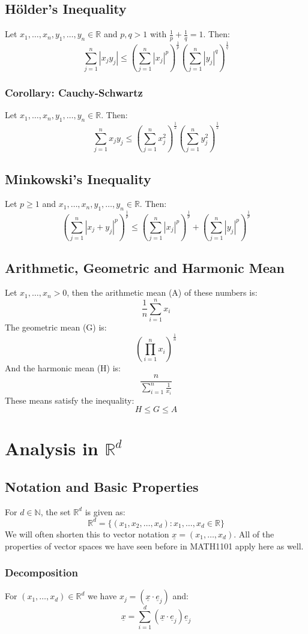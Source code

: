 \documentclass[12pt]{article}
\begin{document}
\subsection{H\"older's Inequality}
Let \(x_1,\dots,x_n,y_1,\dots,y_n\in\mathbb{R}\) and \(p,q>1\) with \(\frac{1}{p}+\frac{1}{q}=1\). Then:
\[\sum^n_{j=1}|x_jy_j|\leq \left(\sum^n_{j=1}|x_j|^p\right)^{\frac{1}{p}}\left(\sum^n_{j=1}|y_j|^q\right)^{\frac{1}{q}}\]
\subsubsection{Corollary: Cauchy-Schwartz}
Let \(x_1,\dots,x_n,y_1,\dots,y_n\in\mathbb{R}\). Then:
\[\sum^n_{j=1}x_jy_j\leq \left(\sum^n_{j=1}x_j^2\right)^{\frac{1}{2}}\left(\sum^n_{j=1}y_j^2\right)^{\frac{1}{2}}\]
\subsection{Minkowski's Inequality}
Let \(p\geq 1\) and \(x_1,\dots,x_n,y_1,\dots,y_n\in\mathbb{R}\). Then:
\[\left(\sum^n_{j=1}|x_j+y_j|^p\right)^{\frac{1}{p}}\leq\left(\sum^n_{j=1}|x_j|^p\right)^{\frac{1}{p}}+\left(\sum^n_{j=1}|y_j|^p\right)^{\frac{1}{p}}\]
\subsection{Arithmetic, Geometric and Harmonic Mean}
Let \(x_1,\dots,x_n>0\), then the arithmetic mean (A) of these numbers is:
\[\frac{1}{n}\sum^n_{i=1}x_i\]
The geometric mean (G) is:
\[\left(\prod^n_{i=1}x_i\right)^{\frac{1}{n}}\]
And the harmonic mean (H) is:
\[\frac{n}{\sum^n_{i=1}\frac{1}{x_i}}\]
These means satisfy the inequality:
\[H\leq G\leq A\]
\clearpage
\section{Analysis in \(\mathbb{R}^d\)}
\subsection{Notation and Basic Properties}
For \(d\in\mathbb{N}\), the set \(\mathbb{R}^d\) is given as:
\[\mathbb{R}^d=\{(x_1,x_2,\dots,x_d):x_1,\dots,x_d\in\mathbb{R}\}\]
We will often shorten this to vector notation \(\underline{x}=(x_1,\dots,x_d)\). All of the properties of vector spaces we have seen before in MATH1101 apply here as well.
\subsubsection{Decomposition}
For \((x_1,\dots,x_d)\in\mathbb{R}^d\) we have \(x_j=(\underline{x}\cdot\underline{e}_j)\) and:
\[\underline{x}=\sum^d_{i=1}(\underline{x}\cdot\underline{e}_j)\underline{e}_j\]
\end{document}
